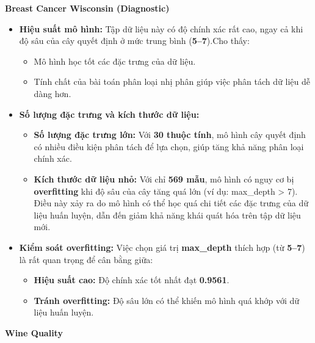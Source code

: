 \textbf{Breast Cancer Wisconsin (Diagnostic)}
\begin{itemize}
	\item \textbf{Hiệu suất mô hình:}  
	Tập dữ liệu này có độ chính xác rất cao, ngay cả khi độ sâu của cây quyết định ở mức trung bình (\textbf{5--7}).Cho thấy:
	\begin{itemize}
		\item Mô hình học tốt các đặc trưng của dữ liệu.
		\item Tính chất của bài toán phân loại nhị phân giúp việc phân tách dữ liệu dễ dàng hơn.
	\end{itemize}
	
	\item \textbf{Số lượng đặc trưng và kích thước dữ liệu:}  
	\begin{itemize}
		\item \textbf{Số lượng đặc trưng lớn:} Với \textbf{30 thuộc tính}, mô hình cây quyết định có nhiều điều kiện phân tách để lựa chọn, giúp tăng khả năng phân loại chính xác.
		\item \textbf{Kích thước dữ liệu nhỏ:} Với chỉ \textbf{569 mẫu}, mô hình có nguy cơ bị \textbf{overfitting} khi độ sâu của cây tăng quá lớn (ví dụ: max\_depth > 7). Điều này xảy ra do mô hình có thể học quá chi tiết các đặc trưng của dữ liệu huấn luyện, dẫn đến giảm khả năng khái quát hóa trên tập dữ liệu mới.
	\end{itemize}
	
	\item \textbf{Kiểm soát overfitting:}  
	Việc chọn giá trị \textbf{max\_depth} thích hợp (từ \textbf{5--7}) là rất quan trọng để cân bằng giữa:
	\begin{itemize}
		\item \textbf{Hiệu suất cao:} Độ chính xác tốt nhất đạt \textbf{0.9561}.
		\item \textbf{Tránh overfitting:} Độ sâu lớn có thể khiến mô hình quá khớp với dữ liệu huấn luyện.
	\end{itemize}
\end{itemize}

\textbf{Wine Quality}

